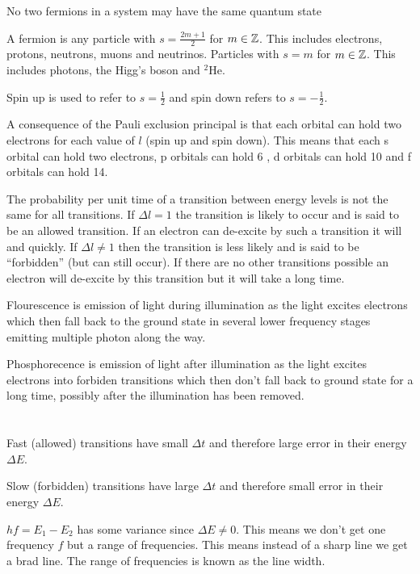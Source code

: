 \begin{displayquote}
No two fermions in a system may have the same quantum state
\end{displayquote}

A fermion is any particle with \(s=\frac{2m+1}{2}\) for \(m\in\mathbb{Z}\). This includes electrons, protons, neutrons, muons and neutrinos. Particles with \(s=m\) for \(m\in\mathbb{Z}\). This includes photons, the Higg's boson and \(^2\)He.

Spin up is used to refer to \(s=\frac12\) and spin down refers to \(s=-\frac12\).

A consequence of the Pauli exclusion principal is that each orbital can hold two electrons for each value of \(l\) (spin up and spin down). This means that each s orbital can hold two electrons, p orbitals can hold 6 , d orbitals can hold 10 and f orbitals can hold 14.

The probability per unit time of a transition between energy levels is not the same for all transitions. If \(\Delta l=1\) the transition is likely to occur and is said to be an allowed transition. If an electron can de-excite by such a transition it will and quickly. If \(\Delta l\ne 1\) then the transition is less likely and is said to be ``forbidden'' (but can still occur). If there are no other transitions possible an electron will de-excite by this transition but it will take a long time.

Flourescence is emission of light during illumination as the light excites electrons which then fall back to the ground state in several lower frequency stages emitting multiple photon along the way.

Phosphorecence is emission of light after illumination as the light excites electrons into forbiden transitions which then don't fall back to ground state for a long time, possibly after the illumination has been removed.

\section{}

Fast (allowed) transitions have small \(\Delta t\) and therefore large error in their energy \(\Delta E\).

Slow (forbidden) transitions have large \(\Delta t\) and therefore small error in their energy \(\Delta E\).

\(hf=E_1-E_2\) has some variance since \(\Delta E\ne 0\). This means we don't get one frequency \(f\) but a range of frequencies. This means instead of a sharp line we get a brad line. The range of frequencies is known as the line width.

